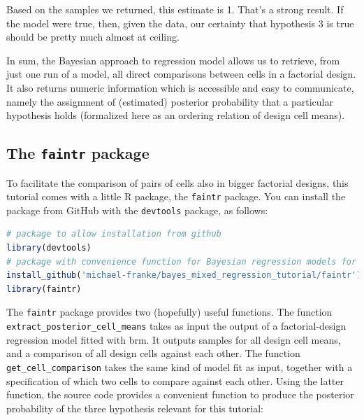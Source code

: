\documentclass[nobib]{tufte-handout}
\begin{document}
Based on the samples we returned, this estimate is 1. That's a strong result. If the model were true, then, given the data, our certainty that hypothesis 3 is true should be pretty much almost at ceiling.

In sum, the Bayesian approach to regression model allows us to retrieve, from just one run of a model, all direct comparisons between cells in a factorial design. It also returns numeric information which is accessible and easy to communicate, namely the assignment of (estimated)
posterior probability that a particular hypothesis holds (formalized here as an ordering relation of design cell means).

\subsection{The \texttt{faintr} package}

To facilitate the comparison of pairs of cells also in bigger factorial designs, this tutorial comes with a little R package, the \texttt{faintr} package.
%
%
You can install the package from GitHub with the \texttt{devtools} package, as follows:

\begin{minipage}[]{1\textwidth}
\begin{lstlisting}[language=R]
# package to allow installation from github
library(devtools)
# package with convenience function for Bayesian regression models for factorial designs
install_github('michael-franke/bayes_mixed_regression_tutorial/faintr') # install from GitHub
library(faintr)
\end{lstlisting}
\end{minipage}

The \texttt{faintr} package provides two (hopefully) useful functions. The function \texttt{extract\_posterior\_cell\_means} takes as input the output of a factorial-design regression model fitted with \textrm{brm}. It outputs samples for all design cell means, and a comparison of all design cells against each other. The function \texttt{get\_cell\_comparison} takes the same kind of model fit as input, together with a specification of which two cells to compare against each other. Using the latter function, the source code provides a convenient function to produce the posterior probability of the three hypothesis relevant for this tutorial:
%
\end{document}
